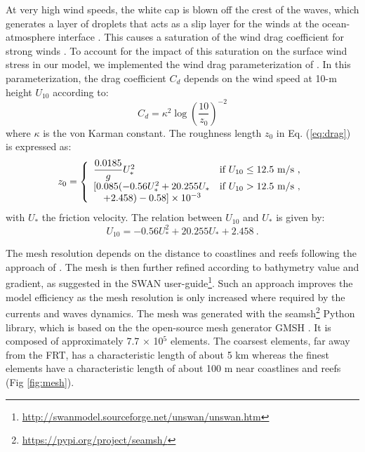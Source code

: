 \documentclass[11pt,a4paper]{article}
\begin{document}
At very high wind speeds, the white cap is blown off the crest of the waves, which generates a layer of droplets that acts as a slip layer for the winds at the ocean-atmosphere interface \citep{holthuijsen2012wind}. This causes a saturation of the wind drag coefficient for strong winds \citep{donelan2004limiting,powell2003reduced}. To account for the impact of this saturation on the surface wind stress in our model, we implemented the wind drag parameterization of \cite{moon2007physics}. In this parameterization, the drag coefficient $C_d$ depends on the wind speed at 10-m height $U_{10}$ according to:
\begin{equation}
    C_d = \kappa^2 \log\left(\dfrac{10}{z_0}\right)^{-2}\label{eq:drag}
\end{equation}
where $\kappa$ is the von Karman constant. The roughness length $z_0$ in Eq. (\ref{eq:drag}) is expressed as: 
\begin{equation}
    z_0 =\left\{\begin{array}[]{ll}
        \dfrac{0.0185}{g}U_{\ast}^2 & \text{if }U_{10} \leq 12.5\text{ m/s}~, \\
        \lbrack 0.085(-0.56U_{\ast}^2+20.255U_{\ast} & \text{if }U_{10} > 12.5\text{ m/s}~, \\
        \quad +2.458) - 0.58\rbrack\times 10^{-3} 
    \end{array}\right.
\end{equation}
with $U_\ast$ the friction velocity. The relation between $U_{10}$ and $U_{\ast}$ is given by:
\begin{equation}
    U_{10}=-0.56U_{\ast}^2+20.255U_{\ast}+2.458~.
\end{equation}

The mesh resolution depends on the distance to coastlines and reefs following the approach of \cite{dobbelaere2020coupled}. The mesh is then further refined according to bathymetry value and gradient, as suggested in the SWAN user-guide\footnote{\url{http://swanmodel.sourceforge.net/unswan/unswan.htm}}. Such an approach improves the model efficiency as the mesh resolution is only increased where required by the currents and waves dynamics. The mesh was generated with the seamsh\footnote{\url{https://pypi.org/project/seamsh/}} Python library, which is based on the the open-source mesh generator GMSH \citep{geuzaine2009gmsh}. It is composed of approximately 7.7 $\times$ 10$^5$ elements. The coarsest elements, far away from the FRT, has a characteristic length of about 5 km whereas the finest elements have a characteristic length of about 100 m near coastlines and reefs (Fig \ref{fig:mesh}).
\end{document}
